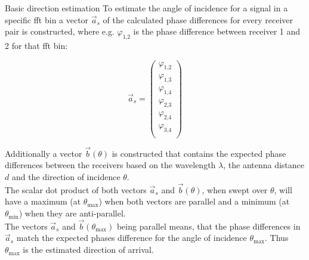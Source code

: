 \begin{subchapter}{Basic direction estimation}
  To estimate the angle of incidence for a signal in a specific
  \gls{fft} bin a vector $\vec{a}_s$ of the calculated phase differences
  for every receiver pair is constructed, where e.g. $\varphi_\text{1,2}$
  is the phase difference between receiver 1 and 2 for that \gls{fft} bin:

  \begin{equation*}
    \vec{a}_s=
    \begin{pmatrix}
      \varphi_\text{1,2} \\
      \varphi_\text{1,3} \\
      \varphi_\text{1,4} \\
      \varphi_\text{2,3} \\
      \varphi_\text{2,4} \\
      \varphi_\text{3,4} \\
    \end{pmatrix}
  \end{equation*}

  Additionally a vector $\vec{b}(\theta)$ is constructed
  that contains the expected phase differences between the
  receivers based on the wavelength $\lambda$, the antenna distance $d$
  and the direction of incidence $\theta$. \\

  The scalar dot product of both vectors $\vec{a}_s$ and $\vec{b}(\theta)$,
  when swept over $\theta$, will have a maximum (at $\theta_\text{max}$)
  when both vectors are parallel and a minimum
  (at $\theta_\text{min}$) when they are anti-parallel. \\

  The vectors $\vec{a}_s$ and $\vec{b}(\theta_\text{max})$ being parallel
  means, that the phase differences in $\vec{a}_s$
  match the expected phases difference for the angle of
  incidence $\theta_\text{max}$.
  Thus $\theta_\text{max}$ is the estimated direction of arrival.
\end{subchapter}

